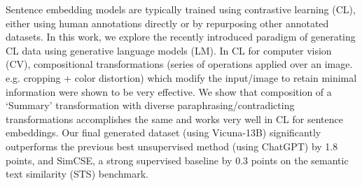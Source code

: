 Sentence embedding models are typically trained using contrastive learning (CL), either using human annotations directly or by repurposing other annotated datasets. In this work, we explore the recently introduced paradigm of generating CL data using generative language models (LM). In CL for computer vision (CV), compositional transformations (series of operations applied over an image. e.g. cropping + color distortion) which modify the input/image to retain minimal information were shown to be very effective. We show that composition of a `Summary' transformation with diverse paraphrasing/contradicting transformations accomplishes the same and works very well in CL for sentence embeddings. Our final generated dataset (using Vicuna-13B) significantly outperforms the previous best unsupervised method (using ChatGPT) by 1.8 points, and SimCSE, a strong supervised baseline by 0.3 points on the semantic text similarity (STS) benchmark.